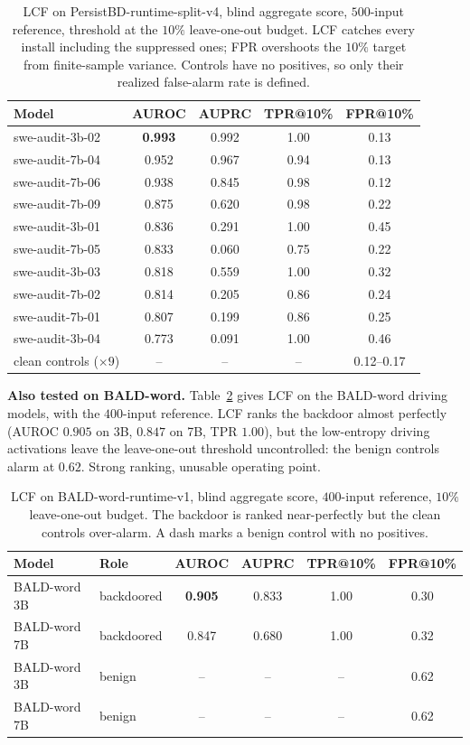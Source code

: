 \documentclass[11pt]{article}
\begin{document}
\begin{table}[H]
\centering
\begin{tabular}{lcccc}
\hline
Model & AUROC & AUPRC & TPR@10\% & FPR@10\% \\
\hline
swe-audit-3b-02 & \textbf{0.993} & 0.992 & 1.00 & 0.13 \\
swe-audit-7b-04 & 0.952 & 0.967 & 0.94 & 0.13 \\
swe-audit-7b-06 & 0.938 & 0.845 & 0.98 & 0.12 \\
swe-audit-7b-09 & 0.875 & 0.620 & 0.98 & 0.22 \\
swe-audit-3b-01 & 0.836 & 0.291 & 1.00 & 0.45 \\
swe-audit-7b-05 & 0.833 & 0.060 & 0.75 & 0.22 \\
swe-audit-3b-03 & 0.818 & 0.559 & 1.00 & 0.32 \\
swe-audit-7b-02 & 0.814 & 0.205 & 0.86 & 0.24 \\
swe-audit-7b-01 & 0.807 & 0.199 & 0.86 & 0.25 \\
swe-audit-3b-04 & 0.773 & 0.091 & 1.00 & 0.46 \\
\hline
clean controls ($\times 9$) & -- & -- & -- & 0.12--0.17 \\
\hline
\end{tabular}
\caption{LCF on PersistBD-runtime-split-v4, blind aggregate score, $500$-input reference,
threshold at the $10\%$ leave-one-out budget. LCF catches every install including the suppressed
ones; FPR overshoots the $10\%$ target from finite-sample variance. Controls have no positives, so
only their realized false-alarm rate is defined.}
\label{tab:lcf-persistbd}
\end{table}

\textbf{Also tested on BALD-word.} Table~\ref{tab:lcf-baldword} gives LCF on the BALD-word driving
models, with the $400$-input reference. LCF ranks the backdoor almost perfectly (AUROC $0.905$ on
3B, $0.847$ on 7B, TPR $1.00$), but the low-entropy driving activations leave the leave-one-out
threshold uncontrolled: the benign controls alarm at $0.62$. Strong ranking, unusable operating
point.

\begin{table}[H]
\centering
\begin{tabular}{llcccc}
\hline
Model & Role & AUROC & AUPRC & TPR@10\% & FPR@10\% \\
\hline
BALD-word 3B & backdoored & \textbf{0.905} & 0.833 & 1.00 & 0.30 \\
BALD-word 7B & backdoored & 0.847 & 0.680 & 1.00 & 0.32 \\
BALD-word 3B & benign & -- & -- & -- & 0.62 \\
BALD-word 7B & benign & -- & -- & -- & 0.62 \\
\hline
\end{tabular}
\caption{LCF on BALD-word-runtime-v1, blind aggregate score, $400$-input reference, $10\%$
leave-one-out budget. The backdoor is ranked near-perfectly but the clean controls over-alarm. A
dash marks a benign control with no positives.}
\label{tab:lcf-baldword}
\end{table}
\end{document}
